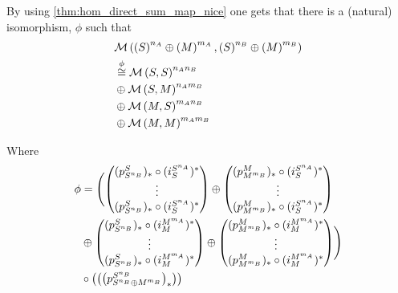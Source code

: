 \begin{remark} \label{rem:big_iso}
    By using \autoref{thm:hom_direct_sum_map_nice} one gets that there is a (natural) isomorphism, \( \phi \) such that
    \begin{align*}
        &{\mathcal{M}}\left( \left(  S  \right)^{n_A} \oplus \left(  M  \right)^{m_A}, \left(  S  \right)^{n_B} \oplus \left(  M  \right)^{m_B} \right) \\
        &\stackrel{\phi}{\cong} {\mathcal{M}}\left(  S, S  \right)^{n_An_B} \\
        &\oplus {\mathcal{M}}\left(  S, M  \right)^{n_Am_B} \\
        &\oplus {\mathcal{M}}\left(  M, S  \right)^{m_An_B} \\
        &\oplus {\mathcal{M}}\left(  M, M  \right)^{m_Am_B}
    \end{align*}

    Where
    \begin{align*}
        \phi &= \Biggl(
            \begin{pmatrix}
                (p_{S^{n_B}}^S)_* \circ (i_{S}^{S^{n_A}})^* \\
                \vdots \\
                (p_{S^{n_B}}^S)_* \circ (i_{S}^{S^{n_A}})^*
            \end{pmatrix} \oplus \begin{pmatrix}
                (p_{M^{m_B}}^M)_* \circ (i_{S}^{S^{n_A}})^* \\
                \vdots \\
                (p_{M^{m_B}}^M)_* \circ (i_{S}^{S^{n_A}})^*
            \end{pmatrix} \\
            &\oplus \begin{pmatrix}
                (p_{S^{n_B}}^S)_* \circ (i_{M}^{M^{m_A}})^* \\
                \vdots \\
                (p_{S^{n_B}}^S)_* \circ (i_{M}^{M^{m_A}})^*
            \end{pmatrix} \oplus \begin{pmatrix}
                (p_{M^{m_B}}^M)_* \circ (i_{M}^{M^{m_A}})^* \\
                \vdots \\
                (p_{M^{m_B}}^M)_* \circ (i_{M}^{M^{m_A}})^*
            \end{pmatrix}
        \Biggr) \\
        &\circ \left(  
            \begin{pmatrix}
                \left(  p_{S^{n_B} \oplus M^{m_B}}^{S^{n_B}}  \right)_* \\

\end{pmatrix} \right)
\end{align*}
\end{remark}
